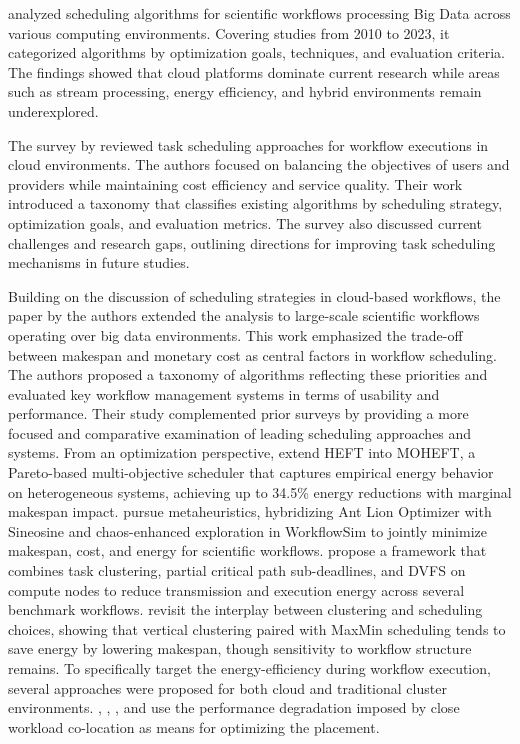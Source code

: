 \cite{10771770} analyzed scheduling algorithms for scientific workflows processing Big Data across various computing environments. Covering studies from 2010 to 2023, it categorized algorithms by optimization goals, techniques, and evaluation criteria. The findings showed that cloud platforms dominate current research while areas such as stream processing, energy efficiency, and hybrid environments remain underexplored.

The survey by \cite{HosseiniShirvani2024} reviewed task scheduling approaches for workflow executions in cloud environments. The authors focused on balancing the objectives of users and providers while maintaining cost efficiency and service quality. Their work introduced a taxonomy that classifies existing algorithms by scheduling strategy, optimization goals, and evaluation metrics. The survey also discussed current challenges and research gaps, outlining directions for improving task scheduling mechanisms in future studies.

Building on the discussion of scheduling strategies in cloud-based workflows, the paper by \cite{9284517} the authors extended the analysis to large-scale scientific workflows operating over big data environments. This work emphasized the trade-off between makespan and monetary cost as central factors in workflow scheduling. The authors proposed a taxonomy of algorithms reflecting these priorities and evaluated key workflow management systems in terms of usability and performance. Their study complemented prior surveys by providing a more focused and comparative examination of leading scheduling approaches and systems.
From an optimization perspective, \cite{Durillo_2014} extend HEFT into MOHEFT, a Pareto-based multi-objective scheduler that captures empirical energy behavior on heterogeneous systems, achieving up to 34.5\% energy reductions with marginal makespan impact.
\cite{Mohammadzadeh_2020} pursue metaheuristics, hybridizing Ant Lion Optimizer with Sineosine and chaos-enhanced exploration in WorkflowSim to jointly minimize makespan, cost, and energy for scientific workflows.
\cite{Choudhary_2022} propose a framework that combines task clustering, partial critical path sub-deadlines, and DVFS on compute nodes to reduce transmission and execution energy across several benchmark workflows.
\cite{Saadi_2023} revisit the interplay between clustering and scheduling choices, showing that vertical clustering paired with MaxMin scheduling tends to save energy by lowering makespan, though sensitivity to workflow structure remains.
To specifically target the energy-efficiency during workflow execution, several approaches were proposed for both cloud and traditional cluster environments. \cite{Lee2012}, \cite{Chen_2023_9beb}, \cite{Blagodurov_2015}, \cite{abdessamia2020energy} and \cite{10.1007/978-3-031-23092-9_35} use the performance degradation imposed by close workload co-location as means for optimizing the placement.

